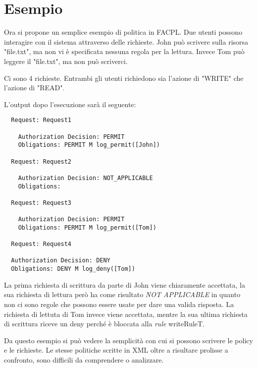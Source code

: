\section{Esempio}
\label{sec:Esempio}
Ora si propone un semplice esempio di politica in FACPL. Due utenti possono interagire con il sistema attraverso delle richieste.
John può scrivere sulla risorsa "file.txt", ma non vi è specificata nessuna regola per la lettura. Invece Tom può
leggere il "file.txt", ma non può scriverci.\par

Ci sono 4 richieste. Entrambi gli utenti richiedono sia l'azione di "WRITE" che l'azione di "READ".

L'output dopo l'esecuzione sarà il seguente:
\begin{verbatim}
  Request: Request1

    Authorization Decision: PERMIT
    Obligations: PERMIT M log_permit([John])

  Request: Request2

    Authorization Decision: NOT_APPLICABLE
    Obligations:

  Request: Request3

    Authorization Decision: PERMIT
    Obligations: PERMIT M log_permit([Tom])

  Request: Request4

  Authorization Decision: DENY
  Obligations: DENY M log_deny([Tom])
\end{verbatim}
La prima richiesta di scrittura da parte di John viene chiaramente accettata, la sua richiesta di lettura però ha
come risultato \emph{NOT APPLICABLE} in quanto non ci sono regole che possono essere usate per dare una valida risposta.
La richiesta di lettuta di Tom invece viene accettata, mentre la sua ultima richiesta di scrittura riceve un deny
perché è bloccata alla \emph{rule} writeRuleT.\par
Da questo esempio si può vedere la semplicità con cui si possono scrivere le policy e le richieste.
Le stesse politiche scritte in XML oltre a risultare prolisse a confronto, sono difficili da comprendere o analizzare.\par
